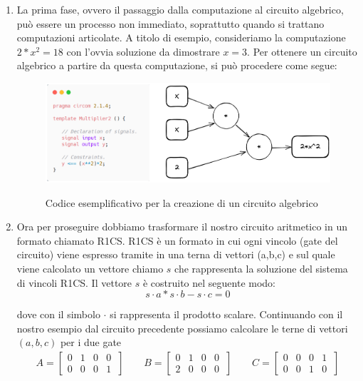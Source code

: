 \begin{enumerate}
    \item  La prima fase, ovvero il passaggio dalla computazione al circuito algebrico, può essere un processo non immediato,
    soprattutto quando si trattano computazioni articolate. A titolo di esempio, consideriamo la computazione $2*x^2=18$ con
    l'ovvia soluzione da dimostrare $x=3$. Per ottenere un circuito algebrico a partire da questa computazione, si può
    procedere come segue:\clearpage
        
    \begin{figure}[H]
        \centering
        \includegraphics[width=14cm]{./chapters/1.state-of-art/images/9.comp_circ.png}
        \label{fig:comp-circ}
        \captionsetup{justification=centering}
        \caption{Codice esemplificativo per la creazione di un circuito algebrico}
    \end{figure}

    \item  Ora per proseguire dobbiamo trasformare il nostro circuito aritmetico in un formato chiamato R1CS. R1CS è un
    formato in cui ogni vincolo (gate del circuito) viene espresso tramite in una terna di vettori (a,b,c) e sul quale viene
    calcolato un vettore chiamo $s$ che rappresenta la soluzione del sistema di vincoli R1CS. Il vettore $s$ è
    costruito nel seguente modo:
    $$
    s \cdot a * s \cdot  b - s \cdot  c = 0
    $$
    
    dove con il simbolo $\cdot$  si rappresenta il prodotto scalare. Continuando con il nostro esempio dal circuito
    precedente possiamo calcolare le terne di vettori $(a,b,c)$ per i due gate
    \begin{gather*}
        A =
        \begin{bmatrix}
        0 & 1 & 0 & 0 \\
        0 & 0 & 0 & 1 \
        \end{bmatrix}
        \qquad
        B =
        \begin{bmatrix}
        0 & 1 & 0 & 0 \\
        2 & 0 & 0 & 0 \
        \end{bmatrix}
        \qquad
        C =
        \begin{bmatrix}
        0 & 0 & 0 & 1 \\
        0 & 0 & 1 & 0 \
        \end{bmatrix}
    \end{gather*}
        

\end{enumerate}
